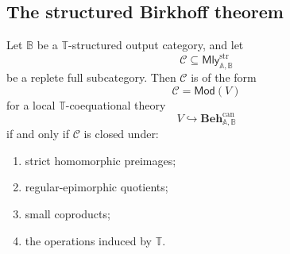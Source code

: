 \subsection{The structured Birkhoff theorem}
\label{subsec:T-coequational-birkhoff}

\begin{theorem}
\label{thm:T-coequational-birkhoff}
    Let \(\mathbb B\) be a \(\mathbb T\)-structured output category, and let
    \[
        \mathcal C\subseteq\mathsf{Mly}^{\mathrm{str}}_{\mathbb A,\mathbb B}
    \]
    be a replete full subcategory. Then \(\mathcal C\) is of the form
    \[
        \mathcal C=\mathsf{Mod}(V)
    \]
    for a local \(\mathbb T\)-coequational theory
    \[
        V\hookrightarrow\mathbf{Beh}^{\mathrm{can}}_{\mathbb A,\mathbb B}
    \]
    if and only if \(\mathcal C\) is closed under:
    \begin{enumerate}
        \item strict homomorphic preimages;
        \item regular-epimorphic quotients;
        \item small coproducts;
        \item the operations induced by \(\mathbb T\).
    \end{enumerate}
\end{theorem}

